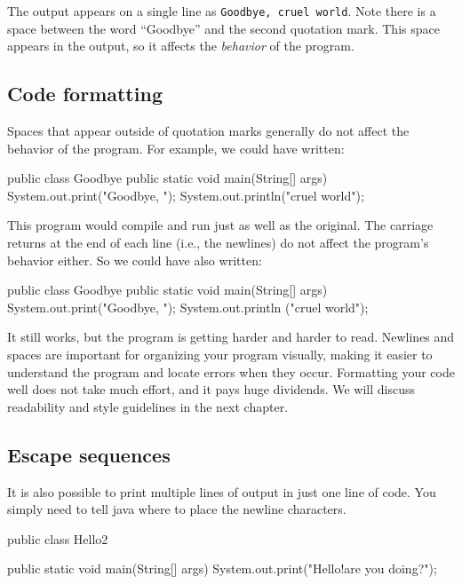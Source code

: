 The output appears on a single line as {\tt Goodbye, cruel world}.
Note there is a space between the word ``Goodbye'' and the second quotation mark.
This space appears in the output, so it affects the {\em behavior} of the program.

\subsection{Code formatting}

Spaces that appear outside of quotation marks generally do not affect the behavior of the program.
For example, we could have written:

\begin{code}
public class Goodbye {
public static void main(String[] args) {
System.out.print("Goodbye, ");
System.out.println("cruel world");
}
}
\end{code}

This program would compile and run just as well as the original.
The carriage returns at the end of each line (i.e., the newlines) do not affect the program's behavior either.
So we could have also written:

\begin{code}
public class Goodbye { public static void main(String[] args) {
System.out.print("Goodbye, "); System.out.println
("cruel world");}}
\end{code}

It still works, but the program is getting harder and harder to read.
Newlines and spaces are important for organizing your program visually, making it easier to understand the program and locate errors when they occur.
Formatting your code well does not take much effort, and it pays huge dividends.
We will discuss readability and style guidelines in the next chapter.

\subsection{Escape sequences}

It is also possible to print multiple lines of output in just one line of code.
You simply need to tell java where to place the newline characters.

\begin{code}
public class Hello2 {

    public static void main(String[] args) {
        System.out.print("Hello!\nHow are you doing?\n");
    }

}

\end{code}

